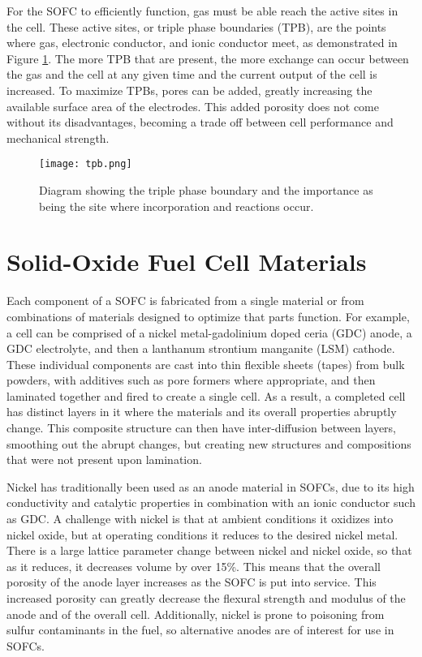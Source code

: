 For the SOFC to efficiently function, gas must be able reach the active sites in the cell.
These active sites, or triple phase boundaries (TPB), are the points where gas, electronic conductor, and ionic conductor meet, as demonstrated in Figure \ref{fig:tpb}.
The more TPB that are present, the more exchange can occur between the gas and the cell at any given time and the current output of the cell is increased.
To maximize TPBs, pores can be added, greatly increasing the available surface area of the electrodes.
This added porosity does not come without its disadvantages, becoming a trade off between cell performance and mechanical strength.\cite{Pihlatie2009,Laurencin2010}
\begin{figure}
  \centering
  \texttt{[image: tpb.png]}
  \caption[Diagram showing the triple phase boundary and the importance as being the site where incorporation and reactions occur.]{Diagram showing the triple phase boundary and the importance as being the site where incorporation and reactions occur.\cite{Wachsman2011a}}\label{fig:tpb}
\end{figure}

\section{Solid-Oxide Fuel Cell Materials}

Each component of a SOFC is fabricated from a single material or from combinations of materials designed to optimize that parts function.
For example, a cell can be comprised of a nickel metal-gadolinium doped ceria (GDC) anode, a GDC electrolyte, and then a lanthanum strontium manganite (LSM) cathode.\cite{Liu2002,Haile2003}
These individual components are cast into thin flexible sheets (tapes) from bulk powders, with additives such as pore formers where appropriate, and then laminated together and fired to create a single cell.
As a result, a completed cell has distinct layers in it where the materials and its overall properties abruptly change.
This composite structure can then have inter-diffusion between layers, smoothing out the abrupt changes, but creating new structures and compositions that were not present upon lamination.\cite{Yokokawa2008}

Nickel has traditionally been used as an anode material in SOFCs, due to its high conductivity and catalytic properties in combination with an ionic conductor such as GDC. %
A challenge with nickel is that at ambient conditions it oxidizes into nickel oxide, but at operating conditions it reduces to the desired nickel metal.
There is a large lattice parameter change between nickel and nickel oxide, so that as it reduces, it decreases volume by over 15\%.
This means that the overall porosity of the anode layer increases as the SOFC is put into service.\cite{Gutierrez-Mora2002,Yu2007}
This increased porosity can greatly decrease the flexural strength and modulus of the anode and of the overall cell.\cite{Callister2014,Barsoum2003}
Additionally, nickel is prone to poisoning from sulfur contaminants in the fuel, so alternative anodes are of interest for use in SOFCs.

